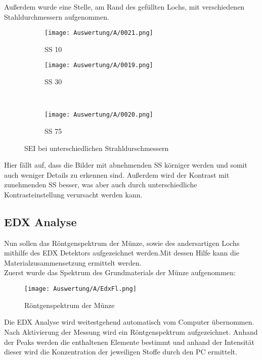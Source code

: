 \newpage
Außerdem wurde eine Stelle, am Rand des gefüllten Lochs, mit verschiedenen Stahldurchmessern aufgenommen.
\begin{figure}[h]
    \centering
    
    \begin{subfigure}[b]{0.45\textwidth}
        \centering
        \texttt{[image: Auswertung/A/0021.png]}
        \caption{SS 10}
    \end{subfigure}
    \hfill
    \begin{subfigure}[b]{0.45\textwidth}
        \centering
        \texttt{[image: Auswertung/A/0019.png]}
        \caption{SS 30}
    \end{subfigure}
    \\
    \begin{subfigure}[b]{0.45\textwidth}
        \centering
        \texttt{[image: Auswertung/A/0020.png]}
        \caption{SS 75}
    \end{subfigure}
    \caption{SEI bei unterschiedlichen Strahldurschmessern}
\end{figure}

Hier fällt auf, dass die Bilder mit abnehmenden SS körniger werden und somit auch weniger Details zu erkennen sind. Außerdem wird der Kontrast mit zunehmenden SS besser, was aber auch durch unterschiedliche Kontrasteinstellung verursacht werden kann.

\newpage
\subsection{EDX Analyse}
Nun sollen das Röntgenspektrum der Münze, sowie des andersartigen Lochs mithilfe des EDX Detektors aufgezeichnet werden.Mit dessen Hilfe kann die Materialzusammensetzung ermittelt werden. \\

Zuerst wurde das Spektrum des Grundmaterials der Münze aufgenommen: 
\begin{figure}[h]
    \centering
    \texttt{[image: Auswertung/A/EdxFl.png]}
    \caption{Röntgenspektrum der Münze}
\end{figure}

Die EDX Analyse wird weitestgehend automatisch vom Computer übernommen. Nach Aktivierung der Messung wird ein Röntgenspektrum aufgezeichnet. Anhand der Peaks werden die enthaltenen Elemente bestimmt und anhand der Intensität dieser wird die Konzentration der jeweiligen Stoffe durch den PC ermittelt.

